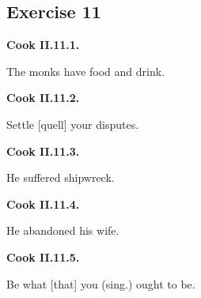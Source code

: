 \subsection*{Exercise 11}

\par\begin{minipage}{\linewidth}\raggedright
\textbf{Cook II.11.1.}

The monks have food and drink.

\end{minipage}\par\addvspace{4pt}

\par\begin{minipage}{\linewidth}\raggedright
\textbf{Cook II.11.2.}

Settle [quell] your disputes.

\end{minipage}\par\addvspace{4pt}

\par\begin{minipage}{\linewidth}\raggedright
\textbf{Cook II.11.3.}

He suffered shipwreck.

\end{minipage}\par\addvspace{4pt}

\par\begin{minipage}{\linewidth}\raggedright
\textbf{Cook II.11.4.}

He abandoned his wife.

\end{minipage}\par\addvspace{4pt}

\par\begin{minipage}{\linewidth}\raggedright
\textbf{Cook II.11.5.}

Be what [that] you (sing.) ought to be.

\end{minipage}\par\addvspace{4pt}

